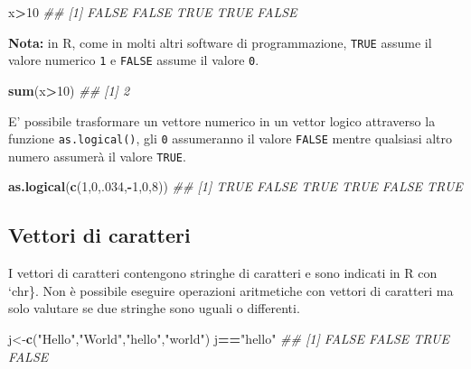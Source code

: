 \documentclass[
]{book}
\newenvironment{Shaded}{\begin{snugshade}}{\end{snugshade}}
\newcommand{\CommentTok}[1]{\textcolor[rgb]{0.56,0.35,0.01}{\textit{#1}}}
\newcommand{\DecValTok}[1]{\textcolor[rgb]{0.00,0.00,0.81}{#1}}
\newcommand{\KeywordTok}[1]{\textcolor[rgb]{0.13,0.29,0.53}{\textbf{#1}}}
\newcommand{\NormalTok}[1]{#1}
\newcommand{\OperatorTok}[1]{\textcolor[rgb]{0.81,0.36,0.00}{\textbf{#1}}}
\newcommand{\StringTok}[1]{\textcolor[rgb]{0.31,0.60,0.02}{#1}}
\begin{document}
\begin{Shaded}
\begin{Highlighting}[]
\NormalTok{x}\OperatorTok{>}\DecValTok{10}
\CommentTok{## [1] FALSE FALSE  TRUE  TRUE FALSE}
\end{Highlighting}
\end{Shaded}

\textbf{Nota:} in R, come in molti altri software di programmazione, \texttt{TRUE} assume il valore numerico \texttt{1} e \texttt{FALSE} assume il valore \texttt{0}.

\begin{Shaded}
\begin{Highlighting}[]
\KeywordTok{sum}\NormalTok{(x}\OperatorTok{>}\DecValTok{10}\NormalTok{)}
\CommentTok{## [1] 2}
\end{Highlighting}
\end{Shaded}

E' possibile trasformare un vettore numerico in un vettor logico attraverso la funzione \texttt{as.logical()}, gli \texttt{0} assumeranno il valore \texttt{FALSE} mentre qualsiasi altro numero assumerà il valore \texttt{TRUE}.

\begin{Shaded}
\begin{Highlighting}[]
\KeywordTok{as.logical}\NormalTok{(}\KeywordTok{c}\NormalTok{(}\DecValTok{1}\NormalTok{,}\DecValTok{0}\NormalTok{,.}\DecValTok{034}\NormalTok{,}\OperatorTok{-}\DecValTok{1}\NormalTok{,}\DecValTok{0}\NormalTok{,}\DecValTok{8}\NormalTok{))}
\CommentTok{## [1]  TRUE FALSE  TRUE  TRUE FALSE  TRUE}
\end{Highlighting}
\end{Shaded}

\hypertarget{vettori-di-caratteri}{%
\subsection{Vettori di caratteri}\label{vettori-di-caratteri}}

I vettori di caratteri contengono stringhe di caratteri e sono indicati in R con `chr\}. Non è possibile eseguire operazioni aritmetiche con vettori di caratteri ma solo valutare se due stringhe sono uguali o differenti.

\begin{Shaded}
\begin{Highlighting}[]
\NormalTok{j<-}\KeywordTok{c}\NormalTok{(}\StringTok{"Hello"}\NormalTok{,}\StringTok{"World"}\NormalTok{,}\StringTok{"hello"}\NormalTok{,}\StringTok{"world"}\NormalTok{)}
\NormalTok{j}\OperatorTok{==}\StringTok{"hello"}
\CommentTok{## [1] FALSE FALSE  TRUE FALSE}
\end{Highlighting}
\end{Shaded}
\end{document}
